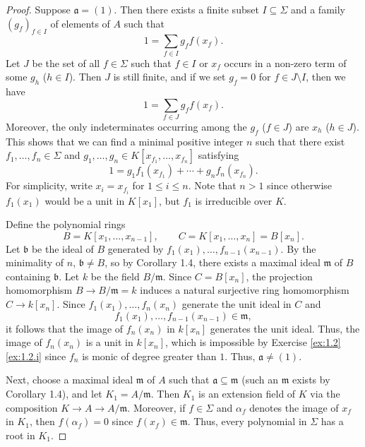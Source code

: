 \begin{proof}
Suppose $\mathfrak a = (1)$.
Then there exists a finite subset $I \subseteq \Sigma$ and a family $(g_f)_{f\in I}$ of elements of $A$ such that
\begin{equation*}
1 = \sum_{f \in I} g_f f(x_f).
\end{equation*}
Let $J$ be the set of all $f\in\Sigma$ such that $f \in I$ or $x_f$ occurs in a non-zero term of some $g_h$ ($h\in I$).
Then $J$ is still finite, and if we set $g_f = 0$ for $f \in J\setminus I$, then we have
\begin{equation*}
1 = \sum_{f \in J} g_f f(x_f).
\end{equation*}
Moreover, the only indeterminates occurring among the $g_f$ ($f\in J$) are $x_h$ ($h\in J$).
This shows that we can find a minimal positive integer $n$ such that there exist $f_1,\ldots,f_n \in \Sigma$ and $g_1,\ldots,g_n \in K[x_{f_1},\ldots,x_{f_n}]$ satisfying
\begin{equation*}
1 = g_1 f_1(x_{f_1}) + \cdots + g_n f_n(x_{f_n}).
\end{equation*}
For simplicity, write $x_i = x_{f_i}$ for $1\leq i \leq n$.
Note that $n > 1$ since otherwise $f_1(x_1)$ would be a unit in $K[x_1]$, but $f_1$ is irreducible over $K$.

Define the polynomial rings
\begin{equation*}
B = K[x_1,\ldots,x_{n-1}],
\qquad
C = K[x_1,\ldots,x_n] = B[x_n].
\end{equation*}
Let $\mathfrak b$ be the ideal of $B$ generated by $f_1(x_1),\ldots,f_{n-1}(x_{n-1})$.
By the minimality of $n$, $\mathfrak b \neq B$, so by Corollary 1.4, there exists a maximal ideal $\mathfrak m$ of $B$ containing $\mathfrak b$.
Let $k$ be the field $B/\mathfrak m$.
Since $C = B[x_n]$, the projection homomorphism $B \to B/\mathfrak m = k$ induces a natural surjective ring homomorphism $C \to k[x_n]$.
Since $f_1(x_1),\ldots,f_n(x_n)$ generate the unit ideal in $C$ and
\begin{equation*}
f_1(x_1),\ldots,f_{n-1}(x_{n-1}) \in \mathfrak m,
\end{equation*}
it follows that the image of $f_n(x_n)$ in $k[x_n]$ generates the unit ideal.
Thus, the image of $f_n(x_n)$ is a unit in $k[x_n]$, which is impossible by Exercise \ref{ex:1.2}\ref{ex:1.2.i} since $f_n$ is monic of degree greater than $1$.
Thus, $\mathfrak a \neq (1)$.

Next, choose a maximal ideal $\mathfrak m$ of $A$ such that $\mathfrak a \subseteq \mathfrak m$ (such an $\mathfrak m$ exists by Corollary 1.4), and let $K_1 = A/\mathfrak m$.
Then $K_1$ is an extension field of $K$ via the composition $K \to A \to A/\mathfrak m$.
Moreover, if $f \in \Sigma$ and $\alpha_f$ denotes the image of $x_f$ in $K_1$, then $f(\alpha_f) = 0$ since $f(x_f) \in \mathfrak m$.
Thus, every polynomial in $\Sigma$ has a root in $K_1$.


\end{proof}
